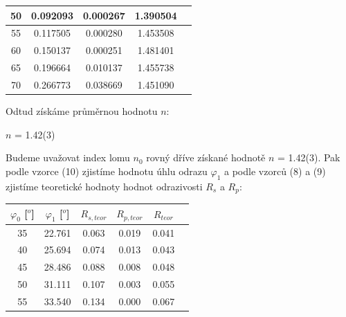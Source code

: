 \documentclass[a4paper,11pt]{article}
\begin{document}
\begin{minipage}[t]{0.5\textwidth}
\begin{tabular}{|c|c|c|c|c}
                    \hline
                    50 & 0.092093 & 0.000267 & 1.390504 \\
                    \hline
                    55 & 0.117505 & 0.000280 & 1.453508 \\
                    \hline
                    60 & 0.150137 & 0.000251 & 1.481401 \\
                    \hline
                    65 & 0.196664 & 0.010137 & 1.455738 \\
                    \hline
                    70 & 0.266773 & 0.038669 & 1.451090 \\
                    \hline
                \end{tabular}
                \captionsetup{justification=centering, font=footnotesize}
                \vspace{10pt}
                \raggedright
                \par Odtud získáme průměrnou hodnotu $n$: 
                \begin{center}
                    $n$ = 1.42(3)
                \end{center}
                Budeme uvažovat index lomu $n_0$ rovný dříve získané hodnotě $n$ = 1.42(3). Pak podle vzorce (10) zjistíme hodnotu úhlu odrazu $\varphi_1$ a podle vzorců (8) a (9) zjistíme teoretické hodnoty hodnot odrazivosti $R_s$ a $R_p$: 
                \par \centering
                \vspace{10pt}
                \begin{tabular}{|c|c|c|c|c|c}
                    \hline
                    $\varphi_0$ [$^o$] & $\varphi_1$ [$^o$] &  $R_{s,teor}$  & $R_{p,teor}$ & $R_{teor}$\\
                    \hline
                    35 & 22.761 & 0.063 & 0.019 & 0.041 \\
                    \hline
                    40 & 25.694 & 0.074 & 0.013 & 0.043 \\
                    \hline
                    45 & 28.486 & 0.088 & 0.008 & 0.048 \\
                    \hline
                    50 & 31.111 & 0.107 & 0.003 & 0.055 \\
                    \hline
                    55 & 33.540 & 0.134 & 0.000 & 0.067 \\

\end{tabular}
\end{minipage}
\end{document}
